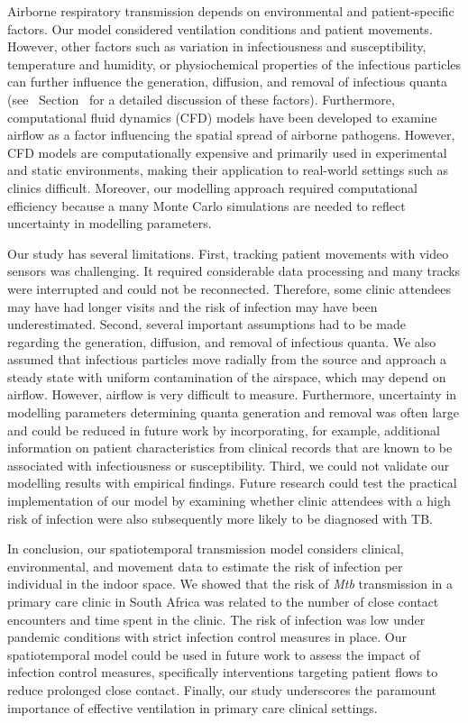 \documentclass[fleqn,11pt]{wlscirep}
\begin{document}
Airborne respiratory transmission depends on environmental and patient-specific factors. Our model considered ventilation conditions and patient movements. However, other factors such as variation in infectiousness and susceptibility, temperature and humidity, or physiochemical properties of the infectious particles can further influence the generation, diffusion, and removal of infectious quanta (see \supp~Section~ for a detailed discussion of these factors). Furthermore, computational fluid dynamics (CFD) models have been developed to examine airflow as a factor influencing the spatial spread of airborne pathogens\cite{Vuorinen2020SafSci,Jung2021InfectChemo,Li2021BuildEnv,Yan2023BE,Qian2009BE,Li2022SOTTE}. However, CFD models are computationally expensive and primarily used in experimental and static environments, making their application to real-world settings such as clinics difficult. Moreover, our modelling approach required computational efficiency because a many Monte Carlo simulations are needed to reflect uncertainty in modelling parameters. 

Our study has several limitations. First, tracking patient movements with video sensors was challenging. It required considerable data processing and many tracks were interrupted and could not be reconnected. Therefore, some clinic attendees may have had longer visits and the risk of infection may have been underestimated. Second, several important assumptions had to be made regarding the generation, diffusion, and removal of infectious quanta. We also assumed that infectious particles move radially from the source and approach a steady state with uniform contamination of the airspace, which may depend on airflow. However, airflow is very difficult to measure. Furthermore, uncertainty in modelling parameters determining quanta generation and removal was often large and could be reduced in future work by incorporating, for example, additional information on patient characteristics from clinical records that are known to be associated with infectiousness\cite{Escombe2008PLoSMed} or susceptibility\cite{Furin2019Lancet}. Third, we could not validate our modelling results with empirical findings. Future research could test the practical implementation of our model by examining whether clinic attendees with a high risk of infection were also subsequently more likely to be diagnosed with TB.  

In conclusion, our spatiotemporal transmission model considers clinical, environmental, and movement data to estimate the risk of infection per individual in the indoor space. We
showed that the risk of \emph{Mtb} transmission in a primary care clinic in South Africa was related to the number of close contact encounters and time spent in the clinic. The risk of infection was low under pandemic conditions with strict infection control measures in place. Our spatiotemporal model could be used in future work to assess the impact of infection control measures, specifically interventions targeting patient flows to reduce prolonged close contact. Finally, our study underscores the paramount importance of effective ventilation in primary care clinical settings. 
\end{document}
